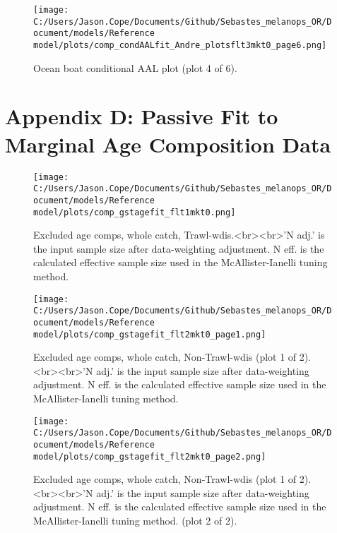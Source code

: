 \documentclass[11pt,
  letterpaper,
]{article}
\begin{document}
\begin{figure}
{\centering
\texttt{[image: C:/Users/Jason.Cope/Documents/Github/Sebastes\_melanops\_OR/Document/models/Reference model/plots/comp\_condAALfit\_Andre\_plotsflt3mkt0\_page6.png]}
}
\caption{Ocean boat conditional AAL plot (plot 4 of 6).\label{fig:comp_condAALfit_Andre_plotsflt3mkt0_page6}}
\end{figure}

\clearpage

\hypertarget{app-d}{%
\section{Appendix D: Passive Fit to Marginal Age Composition Data}\label{app-d}}

\begin{figure}
{\centering
\texttt{[image: C:/Users/Jason.Cope/Documents/Github/Sebastes\_melanops\_OR/Document/models/Reference model/plots/comp\_gstagefit\_flt1mkt0.png]}
}
\caption{Excluded age comps, whole catch, Trawl-wdis.<br><br>'N adj.' is the input sample size after data-weighting adjustment. N eff. is the calculated effective sample size used in the McAllister-Ianelli tuning method.\label{fig:comp_gstagefit_flt1mkt0}}
\end{figure}

\begin{figure}
{\centering
\texttt{[image: C:/Users/Jason.Cope/Documents/Github/Sebastes\_melanops\_OR/Document/models/Reference model/plots/comp\_gstagefit\_flt2mkt0\_page1.png]}
}
\caption{Excluded age comps, whole catch, Non-Trawl-wdis (plot 1 of 2).<br><br>'N adj.' is the input sample size after data-weighting adjustment. N eff. is the calculated effective sample size used in the McAllister-Ianelli tuning method.\label{fig:comp_gstagefit_flt2mkt0_page1}}
\end{figure}

\begin{figure}
{\centering
\texttt{[image: C:/Users/Jason.Cope/Documents/Github/Sebastes\_melanops\_OR/Document/models/Reference model/plots/comp\_gstagefit\_flt2mkt0\_page2.png]}
}
\caption{Excluded age comps, whole catch, Non-Trawl-wdis (plot 1 of 2).<br><br>'N adj.' is the input sample size after data-weighting adjustment. N eff. is the calculated effective sample size used in the McAllister-Ianelli tuning method. (plot 2 of 2).\label{fig:comp_gstagefit_flt2mkt0_page2}}
\end{figure}
\end{document}
